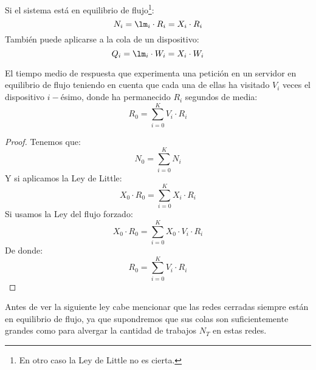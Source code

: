 \begin{prop}
    Si el sistema está en equilibrio de flujo\footnote{En otro caso la Ley de Little no es cierta.}:
    \begin{equation*}
        N_i = \lm_i \cdot R_i = X_i\cdot R_i
    \end{equation*}
    También puede aplicarse a la cola de un dispositivo:
    \begin{equation*}
        Q_i = \lm_i \cdot W_i = X_i\cdot W_i
    \end{equation*}
\end{prop}

\begin{prop}
    El tiempo medio de respuesta que experimenta una petición en un servidor en equilibrio de flujo teniendo en cuenta que cada una de ellas ha visitado $V_i$ veces el dispositivo $i-$ésimo, donde ha permanecido $R_i$ segundos de media:
    \begin{equation*}
        R_0 = \sum_{i=0}^{K} V_i \cdot R_i
    \end{equation*}
    \begin{proof}
        Tenemos que:
        \begin{equation*}
            N_0 = \sum_{i=0}^{K}N_i
        \end{equation*}
        Y si aplicamos la Ley de Little:
        \begin{equation*}
            X_0 \cdot R_0 = \sum_{i=0}^{K}X_i\cdot R_i
        \end{equation*}
        Si usamos la Ley del flujo forzado:
        \begin{equation*}
            X_0 \cdot R_0 = \sum_{i=0}^{K}X_0\cdot V_i\cdot R_i
        \end{equation*}
        De donde:
        \begin{equation*}
            R_0 = \sum_{i=0}^{K}V_i\cdot R_i
        \end{equation*}
    \end{proof}
\end{prop}

Antes de ver la siguiente ley cabe mencionar que las redes cerradas siempre están en equilibrio de flujo, ya que supondremos que sus colas son suficientemente grandes como para alvergar la cantidad de trabajos $N_T$ en estas redes.

